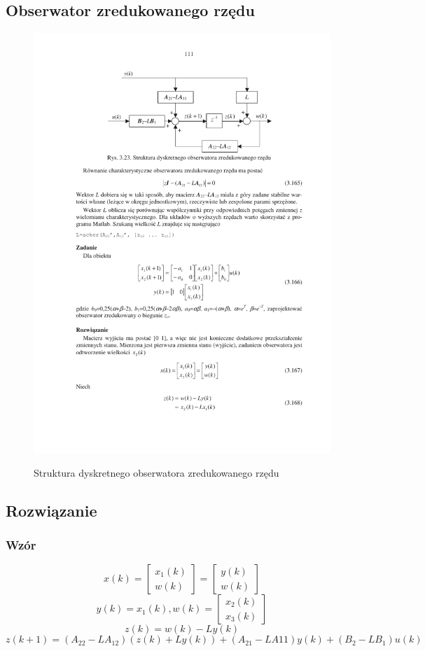 \documentclass{article}
\begin{document}
\subsection{Obserwator zredukowanego rzędu}
\begin{figure}[H]
\includegraphics[clip, trim=0.5cm 0cm 0.5cm 0cm, width=1.00\textwidth]{../rys/obserwator.pdf}
\label{fig:zad4obs}
\caption{Struktura dyskretnego obserwatora zredukowanego rzędu}
\end{figure}
\vspace{0.5cm}

\subsection{Rozwiązanie}
\subsubsection{Wzór}
$$
x(k)=\left[\begin{array}{c} x_1(k)\\ w(k) \end{array}\right]=\left[\begin{array}{c} y(k)\\ w(k) \end{array}\right]
$$
$$
y(k)=x_1(k), w(k)=\left[\begin{array}{c} x_2(k)\\ x_3(k) \end{array}\right]
$$
$$
z(k)=w(k)-Ly(k)
$$
$$
z(k+1)=(A_{22}-LA_{12})(z(k)+Ly(k))+(A_{21}-LA{11})y(k)+(B_2-LB_1)u(k)
$$
\end{document}
